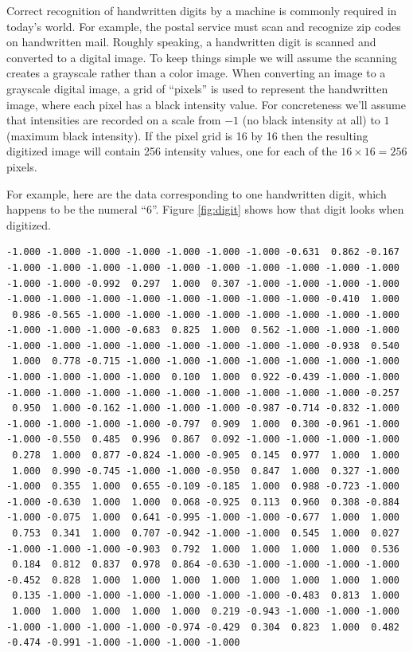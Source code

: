 \documentclass[]{krantz}
\begin{document}
Correct recognition of handwritten digits by a machine is commonly
required in today's world. For example, the postal service must scan and
recognize zip codes on handwritten mail. Roughly speaking, a handwritten
digit is scanned and converted to a digital image. To keep things simple
we will assume the scanning creates a grayscale rather than a color
image. When converting an image to a grayscale digital image, a grid of
``pixels'' is used to represent the handwritten image, where each pixel
has a black intensity value. For concreteness we'll assume that
intensities are recorded on a scale from \(-1\) (no black intensity at
all) to \(1\) (maximum black intensity). If the pixel grid is 16 by 16
then the resulting digitized image will contain 256 intensity values,
one for each of the \(16\times 16 = 256\) pixels.

For example, here are the data corresponding to one handwritten digit,
which happens to be the numeral ``6''. Figure \ref{fig:digit} shows how
that digit looks when digitized.

\begin{verbatim}
-1.000 -1.000 -1.000 -1.000 -1.000 -1.000 -1.000 -0.631  0.862 -0.167 
-1.000 -1.000 -1.000 -1.000 -1.000 -1.000 -1.000 -1.000 -1.000 -1.000 
-1.000 -1.000 -0.992  0.297  1.000  0.307 -1.000 -1.000 -1.000 -1.000 
-1.000 -1.000 -1.000 -1.000 -1.000 -1.000 -1.000 -1.000 -0.410  1.000 
 0.986 -0.565 -1.000 -1.000 -1.000 -1.000 -1.000 -1.000 -1.000 -1.000 
-1.000 -1.000 -1.000 -0.683  0.825  1.000  0.562 -1.000 -1.000 -1.000 
-1.000 -1.000 -1.000 -1.000 -1.000 -1.000 -1.000 -1.000 -0.938  0.540 
 1.000  0.778 -0.715 -1.000 -1.000 -1.000 -1.000 -1.000 -1.000 -1.000 
-1.000 -1.000 -1.000 -1.000  0.100  1.000  0.922 -0.439 -1.000 -1.000 
-1.000 -1.000 -1.000 -1.000 -1.000 -1.000 -1.000 -1.000 -1.000 -0.257 
 0.950  1.000 -0.162 -1.000 -1.000 -1.000 -0.987 -0.714 -0.832 -1.000 
-1.000 -1.000 -1.000 -1.000 -0.797  0.909  1.000  0.300 -0.961 -1.000 
-1.000 -0.550  0.485  0.996  0.867  0.092 -1.000 -1.000 -1.000 -1.000 
 0.278  1.000  0.877 -0.824 -1.000 -0.905  0.145  0.977  1.000  1.000 
 1.000  0.990 -0.745 -1.000 -1.000 -0.950  0.847  1.000  0.327 -1.000 
-1.000  0.355  1.000  0.655 -0.109 -0.185  1.000  0.988 -0.723 -1.000 
-1.000 -0.630  1.000  1.000  0.068 -0.925  0.113  0.960  0.308 -0.884 
-1.000 -0.075  1.000  0.641 -0.995 -1.000 -1.000 -0.677  1.000  1.000 
 0.753  0.341  1.000  0.707 -0.942 -1.000 -1.000  0.545  1.000  0.027 
-1.000 -1.000 -1.000 -0.903  0.792  1.000  1.000  1.000  1.000  0.536 
 0.184  0.812  0.837  0.978  0.864 -0.630 -1.000 -1.000 -1.000 -1.000 
-0.452  0.828  1.000  1.000  1.000  1.000  1.000  1.000  1.000  1.000 
 0.135 -1.000 -1.000 -1.000 -1.000 -1.000 -1.000 -0.483  0.813  1.000 
 1.000  1.000  1.000  1.000  1.000  0.219 -0.943 -1.000 -1.000 -1.000 
-1.000 -1.000 -1.000 -1.000 -0.974 -0.429  0.304  0.823  1.000  0.482 
-0.474 -0.991 -1.000 -1.000 -1.000 -1.000 
\end{verbatim}
\end{document}
